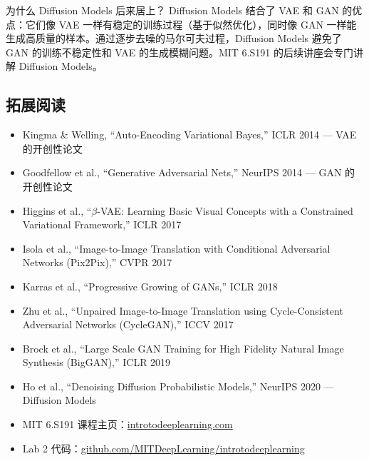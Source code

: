 \begin{knowledgebox}{为什么 Diffusion Models 后来居上？}
Diffusion Models 结合了 VAE 和 GAN 的优点：它们像 VAE 一样有稳定的训练过程（基于似然优化），同时像 GAN 一样能生成高质量的样本。通过逐步去噪的马尔可夫过程，Diffusion Models 避免了 GAN 的训练不稳定性和 VAE 的生成模糊问题。MIT 6.S191 的后续讲座会专门讲解 Diffusion Models。
\end{knowledgebox}

\subsection{拓展阅读}

\begin{itemize}
    \item Kingma \& Welling, ``Auto-Encoding Variational Bayes,'' ICLR 2014 --- VAE 的开创性论文
    \item Goodfellow et al., ``Generative Adversarial Nets,'' NeurIPS 2014 --- GAN 的开创性论文
    \item Higgins et al., ``$\beta$-VAE: Learning Basic Visual Concepts with a Constrained Variational Framework,'' ICLR 2017
    \item Isola et al., ``Image-to-Image Translation with Conditional Adversarial Networks (Pix2Pix),'' CVPR 2017
    \item Karras et al., ``Progressive Growing of GANs,'' ICLR 2018
    \item Zhu et al., ``Unpaired Image-to-Image Translation using Cycle-Consistent Adversarial Networks (CycleGAN),'' ICCV 2017
    \item Brock et al., ``Large Scale GAN Training for High Fidelity Natural Image Synthesis (BigGAN),'' ICLR 2019
    \item Ho et al., ``Denoising Diffusion Probabilistic Models,'' NeurIPS 2020 --- Diffusion Models
    \item MIT 6.S191 课程主页：\href{https://introtodeeplearning.com}{introtodeeplearning.com}
    \item Lab 2 代码：\href{https://github.com/MITDeepLearning/introtodeeplearning}{github.com/MITDeepLearning/introtodeeplearning}
\end{itemize}



